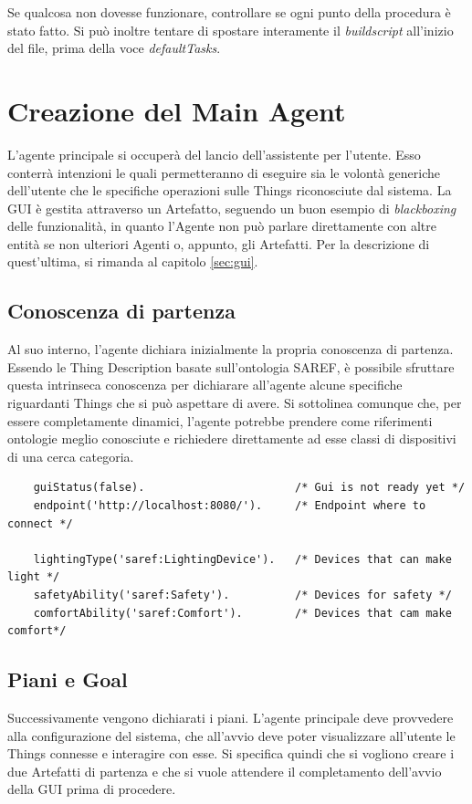 \documentclass[12pt,a4paper,openright,oneside]{report}
\begin{document}
Se qualcosa non dovesse funzionare, controllare se ogni punto della procedura è stato fatto. Si può inoltre tentare di spostare interamente il \textit{buildscript} all'inizio del file, prima della voce \textit{defaultTasks}. 


\section{Creazione del Main Agent}
L'agente principale si occuperà del lancio dell'assistente per l'utente. Esso conterrà intenzioni le quali permetteranno di eseguire sia le volontà generiche dell'utente che le specifiche operazioni sulle Things riconosciute dal sistema. La GUI è gestita attraverso un Artefatto, seguendo un buon esempio di \textit{blackboxing} delle funzionalità, in quanto l'Agente non può parlare direttamente con altre entità se non ulteriori Agenti o, appunto, gli Artefatti. Per la descrizione di quest'ultima, si rimanda al capitolo \ref{sec:gui}.\\

\subsection{Conoscenza di partenza}
Al suo interno, l'agente dichiara inizialmente la propria conoscenza di partenza. Essendo le Thing Description basate sull'ontologia SAREF, è possibile sfruttare questa intrinseca conoscenza per dichiarare all'agente alcune specifiche riguardanti Things che si può aspettare di avere. Si sottolinea comunque che, per essere completamente dinamici, l'agente potrebbe prendere come riferimenti ontologie meglio conosciute e richiedere direttamente ad esse classi di dispositivi di una cerca categoria.\\

\begin{lstlisting}
	guiStatus(false).						/* Gui is not ready yet */
	endpoint('http://localhost:8080/').		/* Endpoint where to connect */
	
	lightingType('saref:LightingDevice').	/* Devices that can make light */
	safetyAbility('saref:Safety').			/* Devices for safety */
	comfortAbility('saref:Comfort').		/* Devices that cam make comfort*/
\end{lstlisting}

\subsection{Piani e Goal}
Successivamente vengono dichiarati i piani. L'agente principale deve provvedere alla configurazione del sistema, che all'avvio deve poter visualizzare all'utente le Things connesse e interagire con esse. Si specifica quindi che si vogliono creare i due Artefatti di partenza e che si vuole attendere il completamento dell'avvio della GUI prima di procedere.
\end{document}
